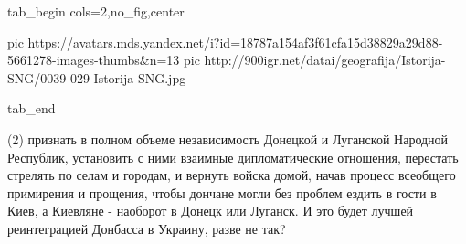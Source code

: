 \ifcmt
  tab_begin cols=2,no_fig,center

     pic https://avatars.mds.yandex.net/i?id=18787a154af3f61cfa15d38829a29d88-5661278-images-thumbs&n=13
     pic http://900igr.net/datai/geografija/Istorija-SNG/0039-029-Istorija-SNG.jpg 

  tab_end
\fi

(2) признать в полном объеме независимость Донецкой и Луганской Народной
Республик, установить с ними взаимные дипломатические отношения, перестать
стрелять по селам и городам, и вернуть войска домой, начав процесс всеобщего
примирения и прощения, чтобы дончане могли без проблем ездить в гости в Киев, а
Киевляне - наоборот в Донецк или Луганск. И это будет лучшей реинтеграцией
Донбасса в Украину, разве не так?
